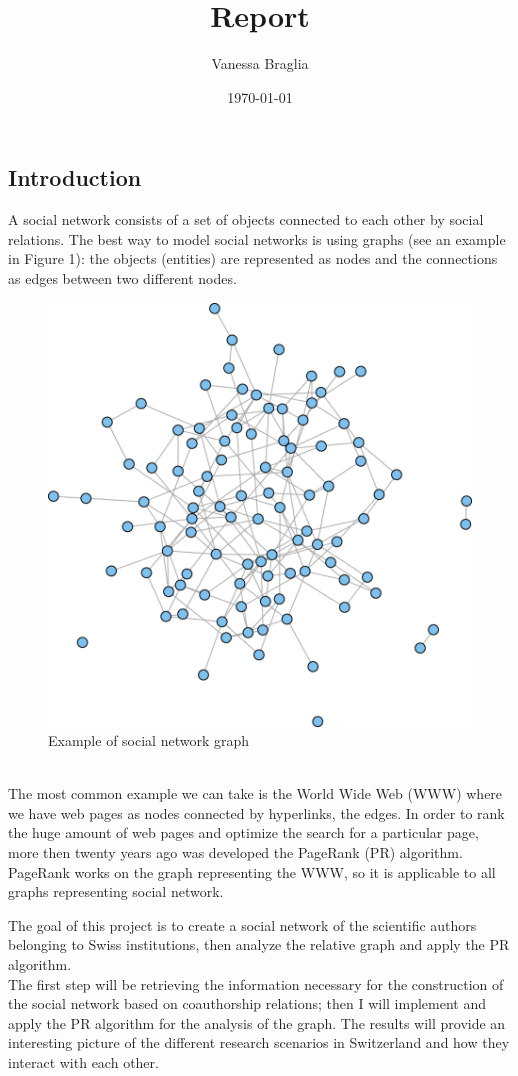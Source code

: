 \documentclass[12 pt]{article}
\author{Vanessa Braglia}
\title{Report}
\date{\today}
\begin{document}
\maketitle 

\subsection*{Introduction}
A social network consists of a set of objects connected to each other by social relations. The best way to model social networks is using graphs (see an example in Figure 1): the objects (entities) are represented as nodes and the connections as edges between two different nodes. \\
\begin{figure} [h!]
\centering 
\includegraphics[scale=0.5]{graph.png}
\caption{Example of social network graph}
\end{figure}
\\
The most common example we can take is the World Wide Web (WWW) where we have web pages as nodes connected by hyperlinks, the edges. In order to rank the huge amount of web pages and optimize the search for a particular page, more then twenty years ago was developed the PageRank (PR) algorithm. PageRank works on the graph representing the WWW, so it is applicable to all graphs representing social network.

The goal of this project is to create a social network of the scientific authors belonging to Swiss institutions, then analyze the relative graph and apply the PR algorithm.\\
The first step will be retrieving the information necessary for the construction of the social network based on coauthorship relations; then I will implement and apply the PR algorithm for the analysis of the graph.
The results will provide an interesting picture of the different research scenarios in Switzerland and how they interact with each other.
\end{document}
